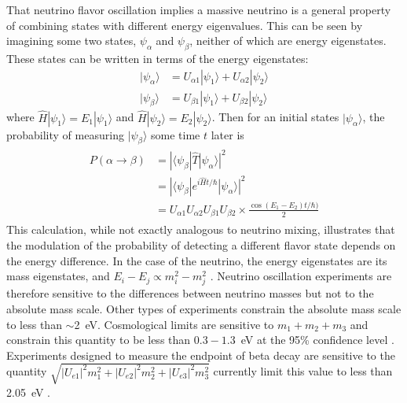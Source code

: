 That neutrino flavor oscillation implies a massive neutrino is a general property of combining states with different energy eigenvalues.  This can be seen by imagining some two states, $\psi_{\alpha}$ and $\psi_{\beta}$, neither of which are energy eigenstates.  These states can be written in terms of the energy eigenstates: 
\begin{align}
|\psi_{\alpha}\rangle &= U_{\alpha 1}|\psi_1\rangle + U_{\alpha 2}|\psi_2\rangle \\
|\psi_{\beta}\rangle &= U_{{\beta}1}|\psi_1\rangle + U_{{\beta}2}|\psi_2\rangle 
\end{align}
where $\hat{H}|\psi_1\rangle = E_1|\psi_1\rangle$ and $\hat{H}|\psi_2\rangle = E_2|\psi_2\rangle$.  Then for an initial states $|\psi_{\alpha}\rangle$, the probability of measuring $|\psi_{\beta}\rangle$ some time $t$ later is
\begin{align}
\begin{split}
P(\alpha\rightarrow\beta) &=  |\langle\psi_{\beta}|\hat{T}|\psi_{\alpha}\rangle|^2 \\
                             &=  |\langle\psi_{\beta}|e^{i\hat{H}t / \hbar}|\psi_{\alpha}\rangle|^2 \\
                             &=  U_{{\alpha}1}U_{{\alpha}2}U_{{\beta}1}U_{{\beta}2} \times \frac{\cos(E_1 - E_2)t/\hbar)}{2} 
\end{split}
\end{align}
This calculation, while not exactly analogous to neutrino mixing, illustrates that the modulation of the probability of detecting a different flavor state depends on the energy difference.  In the case of the neutrino, the energy eigenstates are its mass eigenstates, and $E_i - E_j \propto m_i^2 - m_j^2$ \cite{neutrinoPhase}.  Neutrino oscillation experiments are therefore sensitive to the differences between neutrino masses but not to the absolute mass scale.  Other types of experiments constrain the absolute mass scale to less than $\sim$2~eV.  Cosmological limits are sensitive to $m_1+m_2+m_3$ and constrain this quantity to be less than $0.3-1.3$~eV at the 95\% confidence level \cite{cosmoNuMassLimit}.  Experiments designed to measure the endpoint of beta decay are sensitive to the quantity $\sqrt{|U_{e1}|^2m_1^2 + |U_{e2}|^2m_2^2 + |U_{e3}|^2m_3^2}$ currently limit this value to less than 2.05~eV \cite{tritiumEndpoint}. 

